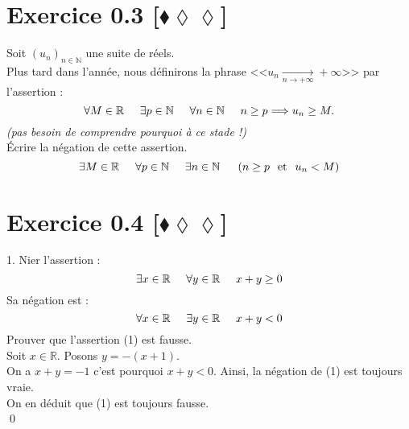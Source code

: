 \documentclass[10pt]{article}
\begin{document}
\section*{Exercice 0.3 [$\blacklozenge\lozenge\lozenge$]}
\begin{tcolorbox}[enhanced, width=6in, center, size=fbox, fontupper=\large, drop shadow southwest]
    Soit $(u_n)_{n\in\mathbb{N}}$ une suite de réels.\\
    Plus tard dans l'année, nous définirons la phrase <<$u_n\underset{n\rightarrow+\infty}{\longrightarrow}+\infty$>> par l'assertion :
    \begin{equation*}
        \forall M\in\mathbb{R}\hspace{0.5cm}\exists p\in\mathbb{N}\hspace{0.5cm} \forall{n}\in\mathbb{N}\hspace{0.5cm}n\geq p\Longrightarrow u_n\geq M.
    \end{equation*}
    \emph{(pas besoin de comprendre pourquoi à ce stade !)}\\
    Écrire la négation de cette assertion.
    \begin{equation*}
        \exists{M\in\mathbb{R}}\hspace{0.5cm}\forall{p\in\mathbb{N}}\hspace{0.5cm}\exists{n\in\mathbb{N}}\hspace{0.5cm}\left(n\geq{p}\hspace{0.25cm}\text{et}\hspace{0.25cm}u_n<M\right)
    \end{equation*}
\end{tcolorbox}

\section*{Exercice 0.4 [$\blacklozenge\lozenge\lozenge$]}
\begin{tcolorbox}[enhanced, width=6in, center, size=fbox, fontupper=\large, drop shadow southwest]
    1. Nier l'assertion :
    \begin{equation}
        \exists{x\in\mathbb{R}}\hspace{0.5cm}\forall{y\in\mathbb{R}}\hspace{0.5cm}x+y\geq0
    \end{equation}
    Sa négation est :
    \begin{equation*}
        \forall{x\in\mathbb{R}}\hspace{0.5cm}\exists{y\in\mathbb{R}}\hspace{0.5cm}x+y<0
    \end{equation*}
    Prouver que l'assertion (1) est fausse.\\
    Soit $x\in\mathbb{R}$. Posons $y=-(x+1)$.\\
    On a $x+y=-1$ c'est pourquoi $x+y<0$. Ainsi, la négation de (1) est toujours vraie.\\
    On en déduit que (1) est toujours fausse.\\
    \qed
\end{tcolorbox}
\end{document}
